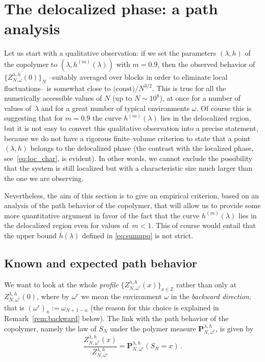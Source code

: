 \documentclass[reqno,11pt]{amsart}
\numberwithin{equation}{section}
\newcommand{\Z}{\mathbb{Z}}
\newcommand{\bP}{{\ensuremath{\mathbf P}} }
\newcommand{\go}{\omega}
\newcommand{\gl}{\lambda}
\begin{document}


\section{The delocalized phase: a path analysis}
\label{sec:path}

Let us start with a qualitative observation: if we set the parameters $(\gl,h)$ of the copolymer to $(\gl, h^{(m)}(\gl))$ with $m = 0.9$, then the observed behavior of $\{Z_{N,\go}^{\gl,h}(0)\}_N$ --suitably averaged over blocks in order to eliminate local fluctuations-- is somewhat close to $\text{(const)}/N^{3/2}$. This is true for all the numerically accessible values of $N$ (up to $N\sim 10^8$), at once for a number of values of~$\gl$ and for a great number of typical environments $\go$. Of course this is suggesting that for $m=0.9$ the curve $h^{(m)}(\gl)$ lies in the delocalized region, but it is not easy to convert this qualitative observation into a precise statement, because we do not have a rigorous finite--volume criterion to state that a point $(\gl,h)$ belongs to the delocalized phase (the contrast with the localized phase, see~\eqref{eq:loc_char}, is evident). In other words, we cannot exclude the possibility that the system is still localized but with a characteristic size much larger than the one we are observing.

Nevertheless, the aim of this section is to give an empirical criterion, based on an analysis of the path behavior of the copolymer, that will allow us to provide some more quantitative argument in favor of the fact that the curve $h^{(m)}(\gl)$ lies in the delocalized region even for values of~$m<1$. This of course would entail that the upper bound $\overline h(\gl)$ defined in \eqref{eq:sumupq} is not strict.

\subsection{Known and expected path behavior}
\label{sec:path1}
We want to look at the whole \textsl{profile} $\{Z_{N,\go^r}^{\gl,h}(x)\}_{x\in\Z}$ rather than only at $Z_{N,\go^r}^{\gl,h}(0)$, where by $\go^r$ we mean the environment $\go$ in the {\sl
 backward direction}, that is $(\go^r)_n := \go_{N+1-n}$ (the reason for this choice is explained in Remark~\ref{rem:backward} below). The link with the path behavior of the copolymer, namely the law of $S_N$ under the polymer measure $\bP_{N,\go^r}^{\gl,h}$, is given by
\begin{equation}
    \frac{Z_{N,\go^r}^{\gl,h}(x)}{Z_{N,\go^r}^{\gl,h}} = \bP_{N,\go^r}^{\gl,h} (S_N = x)\,.
\end{equation}
\end{document}
